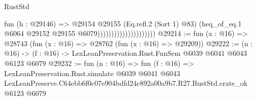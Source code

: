 \begin{lexlean}{RustStd}
\begin{coremodule}
                                          fun (h : @29146) =>
                                          @29154
                                            @29155
                                            (Eq.refl.{2} (Sort 1) @83)
                                            (heq_of_eq.{1}
                                              @6064
                                              @29152
                                              @29155
                                              @6079)))))))))))))))))))))
@29214 := fun (x : @16) => @28743 (fun (x : @16) => @28762 (fun (x : @16) => @29209))
@29222 := (n : @16) -> (f : @16) -> LexLeanPreservation.Rust.FunSem @6039 @6041 @6043 @6123 @6079
@29232 := fun (n : @16) =>
  fun (f : @16) =>
  LexLeanPreservation.Rust.simulate
    @6039
    @6041
    @6043
    LexLeanPreserve.C64ebb6f0c07e904bdfd24c892a00a9b7.R27.RustStd.crate_ok
    @6123
    @6079
\end{coremodule}
\end{lexlean}
